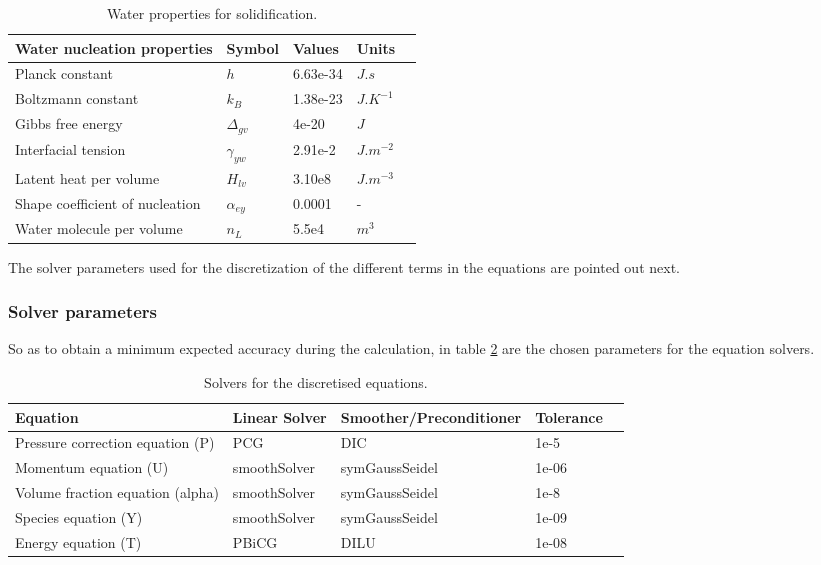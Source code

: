 \begin{table}[h!]
	\begin{tabular}{@{}lllll@{}}
		\toprule[1pt]
		\textbf{Water nucleation properties} & \textbf{Symbol} & \textbf{Values} & \textbf{Units} &  \\ \midrule[2pt]
		Planck constant & $h$ & 6.63e-34 & $J.s$ \\
		Boltzmann constant & $k_{B}$ & 1.38e-23 & $J.K^{-1}$ \\		
		Gibbs free energy & $\Delta_{gv}$ & 4e-20 & $J$ \\
		Interfacial tension & $\gamma_{yw}$ & 2.91e-2 & $J.m^{-2}$ \\		
		Latent heat per volume & $H_{lv}$ & 3.10e8 & $J.m^{-3}$ \\
		Shape coefficient of nucleation & $\alpha_{ey}$ & 0.0001 & - \\		
		Water molecule per volume & $n_{L}$ &  5.5e4  & $m^{3}$ \\		 \bottomrule[1pt]		
	\end{tabular}
	\centering
	\caption{Water properties for solidification.}	
	\label{3.11tab}
\end{table}
The solver parameters used for the discretization of the different terms in the equations are pointed out next. 

\subsubsection*{Solver parameters}
So as to obtain a minimum expected accuracy during the calculation, in table \ref{3.13tab} are the chosen parameters for the equation solvers.
\clearpage
\begin{table}[h!]
\begin{adjustbox}{width=1\textwidth}
	\small		
	\begin{tabular}{@{}lllll@{}}
		\toprule[1pt]
		\textbf{Equation} & \textbf{Linear Solver} & \textbf{Smoother/Preconditioner} & \textbf{Tolerance} &  \\ \midrule[2pt]
		Pressure correction equation (P) & PCG & DIC & 1e-5 \\
		Momentum equation (U)& smoothSolver & symGaussSeidel  & 1e-06 \\
		Volume fraction equation (alpha) & smoothSolver & symGaussSeidel  & 1e-8 \\
		Species equation  (Y)   & smoothSolver   & symGaussSeidel &1e-09 \\		 
		Energy equation (T)    &  PBiCG  &  DILU
		&  1e-08  \\ \bottomrule[1pt]		
	\end{tabular}
\end{adjustbox}
	\centering
	\caption{Solvers for the discretised equations.}	
	\label{3.13tab}
\end{table}
\clearpage
